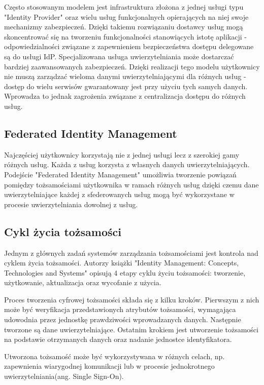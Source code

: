 	Często stosowanym modelem jest infrastruktura złożona z jednej usługi typu "Identity Provider" oraz wielu usług funkcjonalnych opierających na niej swoje mechanizmy zabezpieczeń. Dzięki takiemu rozwiązaniu dostawcy usług mogą skoncentrować się na tworzeniu funkcjonalności stanowiących istotę aplikacji - odpowiedzialności związane z zapewnieniem bezpieczeństwa dostępu delegowane są do usługi IdP. Specjalizowana usługa uwierzytelniania może dostarczać bardziej zaawansowanych zabezpieczeń. Dzięki realizacji tego modelu użytkownicy nie muszą zarządzać wieloma danymi uwierzytelniającymi dla różnych usług - dostęp do wielu serwisów gwarantowany jest przy użyciu tych samych danych. Wprowadza to jednak zagrożenia związane z centralizacja dostępu do różnych usług.

\subsection{Federated Identity Management}

Najczęściej użytkownicy korzystają nie z jednej usługi lecz z szerokiej gamy różnych usług. Każda z usług korzysta z własnych danych uwierzytelniających. Podejście "Federated Identity Management" umożliwia tworzenie powiązań pomiędzy tożsamościami użytkownika w ramach różnych usług dzięki czemu dane uwierzytelniające każdej z sfederowanych usług mogą być wykorzystane w procesie uwierzytelniania dowolnej z usług.

\subsection{Cykl życia tożsamości}

Jednym z głównych zadań systemów zarządzania tożsamościami jest kontrola nad cyklem życia tożsamości. Autorzy książki "Identity Management: Concepts, Technologies and Systems" opisują 4 etapy cyklu życiu tożsamości: tworzenie, użytkowanie, aktualizacja oraz wycofanie z użycia\cite{Bertino11}.

Proces tworzenia cyfrowej tożsamości składa się z kilku kroków. Pierwszym z nich może być weryfikacja przedstawionych atrybutów tożsamości, wymagająca udowodnia przez jednostkę prawdziwości wprowadzanych danych. Następnie tworzone są dane uwierzytelniające. Ostatnim krokiem jest utworzenie tożsamości na podstawie otrzymanych danych oraz nadanie jednostce identyfikatora.

Utworzona tożsamość może być wykorzystywana w różnych celach, np. zapewnienia wiarygodnej komunikacji lub w procesie jednokrotnego uwierzytelniania(ang. Single Sign-On).

